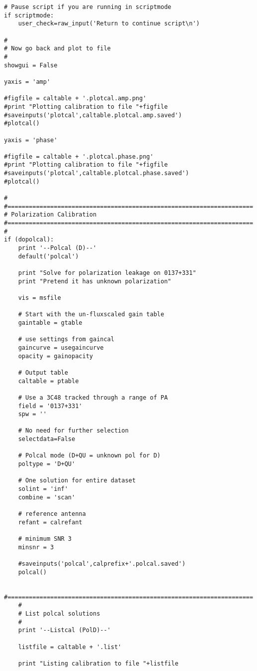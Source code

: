 \begin{verbatim}
# Pause script if you are running in scriptmode
if scriptmode:
    user_check=raw_input('Return to continue script\n')

#
# Now go back and plot to file
#
showgui = False

yaxis = 'amp'

#figfile = caltable + '.plotcal.amp.png'
#print "Plotting calibration to file "+figfile
#saveinputs('plotcal',caltable.plotcal.amp.saved')
#plotcal()

yaxis = 'phase'

#figfile = caltable + '.plotcal.phase.png'
#print "Plotting calibration to file "+figfile
#saveinputs('plotcal',caltable.plotcal.phase.saved')
#plotcal()

#
#=====================================================================
# Polarization Calibration
#=====================================================================
#
if (dopolcal):
    print '--Polcal (D)--'
    default('polcal')
    
    print "Solve for polarization leakage on 0137+331"
    print "Pretend it has unknown polarization"

    vis = msfile

    # Start with the un-fluxscaled gain table
    gaintable = gtable

    # use settings from gaincal
    gaincurve = usegaincurve
    opacity = gainopacity
    
    # Output table
    caltable = ptable

    # Use a 3C48 tracked through a range of PA
    field = '0137+331'
    spw = ''

    # No need for further selection
    selectdata=False

    # Polcal mode (D+QU = unknown pol for D)
    poltype = 'D+QU'

    # One solution for entire dataset
    solint = 'inf'
    combine = 'scan'

    # reference antenna
    refant = calrefant

    # minimum SNR 3
    minsnr = 3

    #saveinputs('polcal',calprefix+'.polcal.saved')
    polcal()
    
    #=====================================================================
    #
    # List polcal solutions
    #
    print '--Listcal (PolD)--'

    listfile = caltable + '.list'

    print "Listing calibration to file "+listfile


\end{verbatim}
